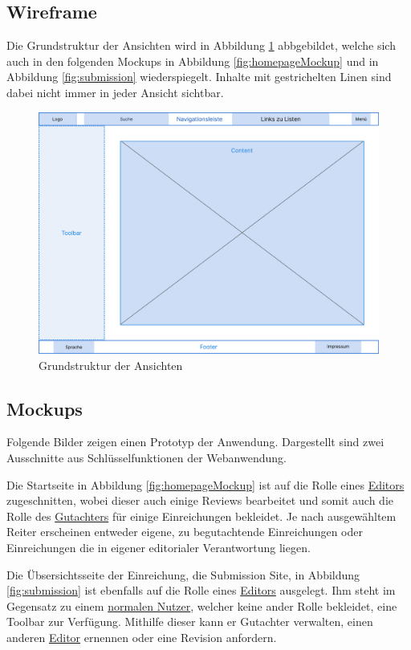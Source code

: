 \subsection{Wireframe}

Die Grundstruktur der Ansichten wird in Abbildung \ref{fig:wireframe} abbgebildet, welche sich auch in den folgenden Mockups in Abbildung \ref{fig:homepageMockup} und in Abbildung \ref{fig:submission} wiederspiegelt.
Inhalte mit gestrichelten Linen sind dabei nicht immer in jeder Ansicht sichtbar.

\begin{figure}[H]
	\centering
	\includegraphics[width=0.85\linewidth]{graphics/Wireframe}
	\caption{Grundstruktur der Ansichten}
	\label{fig:wireframe}
\end{figure}

\subsection{Mockups}

Folgende Bilder zeigen einen Prototyp der Anwendung.
Dargestellt sind zwei Ausschnitte aus Schlüsselfunktionen der Webanwendung.

Die Startseite in Abbildung \ref{fig:homepageMockup} ist auf die Rolle eines \hyperref[glo:editor]{Editors} zugeschnitten, wobei dieser auch einige
Reviews bearbeitet und somit auch die Rolle des \hyperref[glo:gutachter]{Gutachters} für einige Einreichungen bekleidet.
Je nach ausgewähltem Reiter erscheinen entweder eigene, zu begutachtende Einreichungen oder Einreichungen die in eigener editorialer Verantwortung liegen.

Die Übsersichtsseite der Einreichung, die Submission Site, in Abbildung \ref{fig:submission} ist ebenfalls auf die Rolle eines \hyperref[glo:editor]{Editors} ausgelegt.
Ihm steht im Gegensatz zu einem \hyperref[glo:regnutzer]{normalen Nutzer}, welcher keine ander Rolle bekleidet, eine Toolbar zur Verfügung.
Mithilfe dieser kann er Gutachter verwalten, einen anderen \hyperref[glo:editor]{Editor} ernennen oder eine Revision anfordern.


